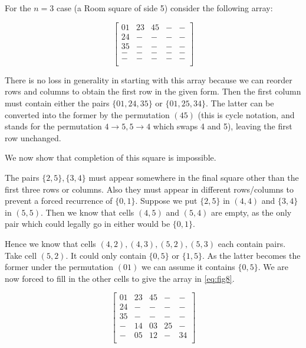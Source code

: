 For the $n = 3$ case (a Room square of side 5) consider the following array:

\begin{equation}
  \begin{bmatrix}
    01 & 23 & 45 & - & -  \\
    24 &  - &  - & - & -  \\
    35 &  - &  - & - & -  \\
     - &  - &  - & - & -  \\
     - &  - &  - & - & -  \\
  \end{bmatrix}
\end{equation}

There is no loss in generality in starting with this array because we can reorder rows and columns to obtain the first row in the given form.
Then the first column must contain either the pairs $\{01, 24, 35\}$ or $\{01, 25, 34\}$.
The latter can be converted into the former by the permutation $(45)$ (this is cycle notation, and stands for the permutation $4 \rightarrow 5, 5 \rightarrow 4$ which swaps 4 and 5), leaving the first row unchanged.

We now show that completion of this square is impossible.

The pairs $\{2,5\}, \{3,4\}$ must appear somewhere in the final square other than the first three rows or columns.
Also they must appear in different rows/columns to prevent a forced recurrence of $\{0, 1\}$.
Suppose we put $\{2, 5\}$ in $(4, 4)$ and $\{3, 4\}$ in $(5, 5)$.
Then we know that cells $(4, 5)$ and $(5, 4)$ are empty, as the only pair which could legally go in either would be $\{0, 1\}$.

Hence we know that cells $(4, 2), (4, 3), (5, 2), (5, 3)$ each contain pairs.
Take cell $(5, 2)$.
It could only contain $\{0, 5\}$ or $\{1, 5\}$.
As the latter becomes the former under the permutation $(01)$ we can assume it contains $\{0, 5\}$.
We are now forced to fill in the other cells to give the array in \eqref{eq:fig8}.

\begin{equation}
  \label{eq:fig8}
  \begin{bmatrix}
    01 & 23 & 45 &  - & -  \\
    24 &  - &  - &  - & -  \\
    35 &  - &  - &  - & -  \\
     - & 14 & 03 & 25 & -  \\
     - & 05 & 12 &  - & 34 \\
  \end{bmatrix}
\end{equation}

